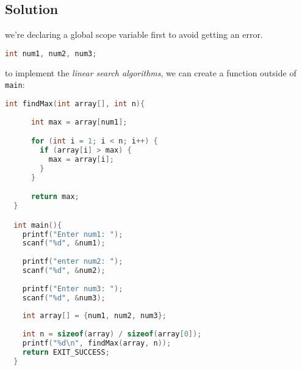 \documentclass{article}
\begin{document}
  \begin{center}
  \end{center}

  \subsection{Solution}

  we're declaring a global scope variable first to avoid getting an error.

  \begin{lstlisting}[language=C, caption=Global Scope variable]
    int num1, num2, num3;
  \end{lstlisting}

  to implement the \textit{linear search algorithms}, we can create a function outside of \texttt{main}:

  \begin{lstlisting}[language=C, caption=findMax function]
    int findMax(int array[], int n){
  
      int max = array[num1];

      for (int i = 1; i < n; i++) {
        if (array[i] > max) {
          max = array[i];
        }
      }

      return max;
  }

  int main(){
    printf("Enter num1: ");
    scanf("%d", &num1);
  
    printf("enter num2: "); 
    scanf("%d", &num2);
  
    printf("Enter num3: ");
    scanf("%d", &num3);
  
    int array[] = {num1, num2, num3};
  
    int n = sizeof(array) / sizeof(array[0]);
    printf("%d\n", findMax(array, n));
    return EXIT_SUCCESS;
  }
  \end{lstlisting}
\end{document}
